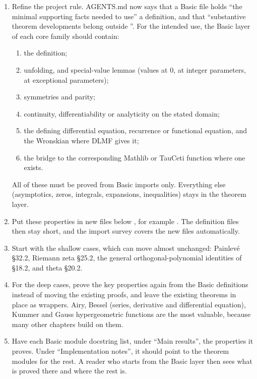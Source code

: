 \documentclass[11pt,a4paper]{article}
\begin{document}
\begin{enumerate}
  \item Refine the project rule. AGENTS.md now says that a Basic file holds ``the minimal
    supporting facts needed to use'' a definition, and that ``substantive theorem developments
    belong outside ''. For the intended use, the Basic layer of each core family
    should contain:
    \begin{enumerate}
      \item the definition;
      \item unfolding,  and special-value lemmas (values at \(0\), at integer
        parameters, at exceptional parameters);
      \item symmetries and parity;
      \item continuity, differentiability or analyticity on the stated domain;
      \item the defining differential equation, recurrence or functional equation, and the
        Wronskian where DLMF gives it;
      \item the bridge to the corresponding Mathlib or TauCeti function where one exists.
    \end{enumerate}
    All of these must be proved from Basic imports only. Everything else (asymptotics, zeros,
    integrals, expansions, inequalities) stays in the theorem layer.
  \item Put these properties in new files below , for example
    . The definition files then stay short, and the import
    survey covers the new files automatically.
  \item Start with the shallow cases, which can move almost unchanged: Painlevé §32.2, Riemann
    zeta §25.2, the general orthogonal-polynomial identities of §18.2, and theta §20.2.
  \item For the deep cases, prove the key properties again from the Basic definitions instead
    of moving the existing proofs, and leave the existing theorems in place as wrappers. Airy,
    Bessel (series, derivative and differential equation), Kummer and Gauss hypergeometric
    functions are the most valuable, because many other chapters build on them.
  \item Have each Basic module docstring list, under ``Main results'', the properties it
    proves. Under ``Implementation notes'', it should point to the theorem modules for the
    rest. A reader who starts from the Basic layer then sees what is proved there and where the
    rest is.
\end{enumerate}
\end{document}
